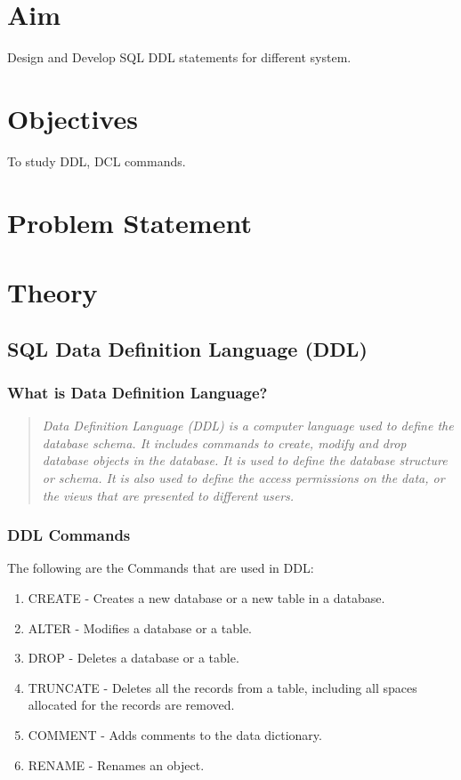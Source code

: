 \documentclass[11pt]{article}
\begin{document}
\tableofcontents
\thispagestyle{empty}
\clearpage

\setcounter{page}{1}

\section{Aim}
Design and Develop SQL DDL statements for different system.

\section{Objectives}
To study DDL, DCL commands.

\section{Problem Statement}

\section{Theory}
\subsection{SQL Data Definition Language (DDL)}

\subsubsection{What is Data Definition Language?}
\begin{quote}
	\textit{Data Definition Language (DDL) is a computer language used to define the database schema. It includes commands to create, modify and drop database objects in the database. It is used to define the database structure or schema. It is also used to define the access permissions on the data, or the views that are presented to different users.}
\end{quote}
\subsubsection{DDL Commands}

The following are the Commands that are used in DDL:

\begin{enumerate}
	\item CREATE - Creates a new database or a new table in a database.
	\item ALTER - Modifies a database or a table.
	\item DROP - Deletes a database or a table.
	\item TRUNCATE - Deletes all the records from a table, including all spaces allocated for the records are removed.
	\item COMMENT - Adds comments to the data dictionary.
	\item RENAME - Renames an object.
\end{enumerate}
\end{document}
